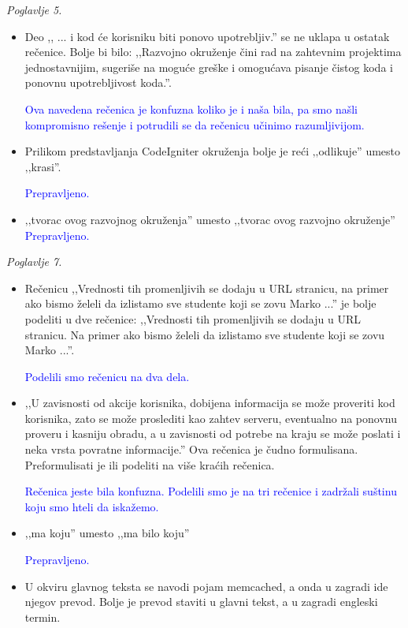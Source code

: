 \documentclass[a4paper]{report}
\newcommand{\odgovor}[1]{\textcolor{blue}{#1}}
\begin{document}
\textit{Poglavlje 5.}
\begin{itemize}
\item Deo ,, ... i kod će korisniku biti ponovo upotrebljiv.'' se ne uklapa u ostatak rečenice. Bolje bi bilo: ,,Razvojno okruženje čini rad na zahtevnim projektima jednostavnijim, sugeriše na moguće greške i omogućava pisanje čistog koda i ponovnu upotrebljivost koda.''.

\odgovor{Ova navedena rečenica je konfuzna koliko je i naša bila, pa smo našli kompromisno rešenje i potrudili se da rečenicu učinimo razumljivijom.}

\item Prilikom predstavljanja CodeIgniter okruženja bolje je reći ‚‚odlikuje'' umesto ‚‚krasi''.

\odgovor{Prepravljeno.}

\item ‚‚tvorac ovog razvojnog okruženja'' umesto ‚‚tvorac ovog razvojno okruženje''\\

\odgovor{Prepravljeno.}
\end{itemize}

\textit{Poglavlje 7.}
\begin{itemize}
\item Rečenicu ,,Vrednosti tih promenljivih se dodaju u URL stranicu, na primer ako bismo želeli da izlistamo sve studente koji se zovu Marko ...'' je bolje podeliti u dve rečenice: ,,Vrednosti tih promenljivih se dodaju u URL stranicu. Na primer ako bismo želeli da izlistamo sve studente koji se zovu Marko ...''.

\odgovor{Podelili smo rečenicu na dva dela.}

\item ,,U zavisnosti od akcije korisnika, dobijena informacija se može proveriti kod korisnika,
zato se može proslediti kao zahtev serveru, eventualno na ponovnu proveru i kasniju obradu, a u zavisnosti od potrebe na kraju se može poslati i neka vrsta povratne informacije.'' Ova rečenica je čudno formulisana. Preformulisati je ili podeliti na više kraćih rečenica.

\odgovor{Rečenica jeste bila konfuzna. Podelili smo je na tri rečenice i zadržali suštinu koju smo hteli da iskažemo.}

\item ,,ma koju'' umesto ,,ma bilo koju''

\odgovor{Prepravljeno.}

\item U okviru glavnog teksta se navodi pojam memcached, a onda u zagradi ide njegov prevod. Bolje je prevod staviti u glavni tekst, a u zagradi engleski termin.\\
\end{itemize}
\end{document}

